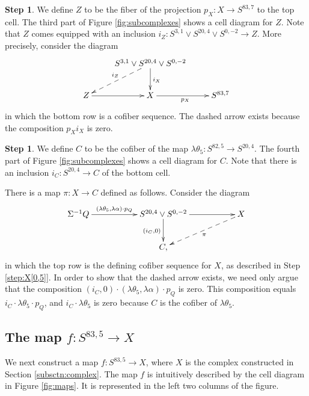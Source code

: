 \documentclass{amsart}
\theoremstyle{definition}
\newtheorem{step}[thm]{Step}
\newcommand{\map}{\rightarrow}
\newcommand{\Xonefour}{C}
\newcommand{\Xzerofour}{Z}
\begin{document}
\begin{step}
\label{step:X[0,4]}
We define $\Xzerofour$ to be the fiber of the projection
$p_X: X \map S^{83, 7}$ to the top cell.
The third part of Figure \ref{fig:subcomplexes}
shows a cell diagram for $\Xzerofour$.
Note that $\Xzerofour$ comes equipped with an inclusion
$i_\Xzerofour: S^{3, 1} \vee S^{20, 4} \vee S^{0, -2} \map \Xzerofour$.
More precisely, consider the diagram
\[
\xymatrix{
& S^{3,1} \vee S^{20, 4} \vee S^{0,-2} \ar[d]^{i_X}
\ar@{-->}[dl]_{i_\Xzerofour} \\
\Xzerofour \ar[r] & X \ar[r]_{p_X} & S^{83, 7}
}
\]
in which the bottom row is a cofiber sequence.  The dashed arrow
exists because the composition $p_X i_X$ is zero.
\end{step}

\begin{step}
\label{step:X1,4}
We define $\Xonefour$ to be the cofiber of the map
$\lambda \theta_5: S^{82, 5} \map S^{20,4}$.
The fourth part of Figure \ref{fig:subcomplexes} shows a cell diagram
for $\Xonefour$.
Note that there is an inclusion
$i_\Xonefour: S^{20, 4} \map \Xonefour$ of the bottom cell.


There is a map $\pi: X \map C$ defined as follows.
Consider the diagram
\[
\xymatrix{
\Sigma^{-1} Q \ar[rr]^-{(\lambda \theta_5, \lambda \alpha) \cdot p_Q} &&
S^{20, 4} \vee S^{0, -2} \ar[rr] \ar[d]_{(i_C, 0)} && X \ar@{-->}[dll]^{\pi} \\
&& C,
}
\]
in which the top row is the defining cofiber sequence for
$X$, as described in Step \ref{step:X[0,5]}.
In order to show that the dashed arrow exists, we need only argue that
the composition $(i_C, 0) \cdot (\lambda \theta_5, \lambda \alpha) \cdot
p_Q$ is zero.  This composition equals $i_C \cdot \lambda \theta_5 \cdot p_Q$, and $i_C \cdot \lambda \theta_5$ is zero because
$C$ is the cofiber of $\lambda \theta_5$.
\end{step}


\subsection{The map $f: S^{83,5} \map X$}
\label{subsctn:f}

We next construct a map
$f: S^{83, 5} \map X$, where $X$ is the complex constructed
in Section \ref{subsctn:complex}.
The map $f$ is intuitively described by
the cell diagram in Figure \ref{fig:maps}.
It is represented in the left two columns of the figure.
\end{document}
